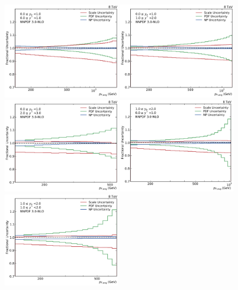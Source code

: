 \begin{figure}[htbp]
    \centering
    \includegraphics[width=0.45\textwidth]{figures/theory/theo_unc_yb0ys0.pdf}\hfill
    \includegraphics[width=0.45\textwidth]{figures/theory/theo_unc_yb0ys1.pdf}
    \includegraphics[width=0.45\textwidth]{figures/theory/theo_unc_yb0ys2.pdf}\hfill
    \includegraphics[width=0.45\textwidth]{figures/theory/theo_unc_yb1ys0.pdf}
    \includegraphics[width=0.45\textwidth]{figures/theory/theo_unc_yb1ys1.pdf}\hfill

\end{figure}
